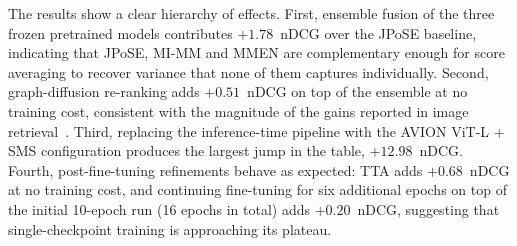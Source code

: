 \begin{table}[t]
\centering
\small
\caption{Official Codabench nDCG~AVG (\%) for the six submitted configurations of Section~\ref{sec:methods}. The $\Delta$ column reports the marginal change with respect to the previous row. Best per approach in \textbf{bold}.}
\label{tab:iterations}
\setlength{\tabcolsep}{6pt}
\end{table}

The results show a clear hierarchy of effects. First, ensemble fusion of the three frozen pretrained models contributes $+1.78$~nDCG over the JPoSE baseline, indicating that JPoSE, MI-MM and MMEN are complementary enough for score averaging to recover variance that none of them captures individually. Second, graph-diffusion re-ranking adds $+0.51$~nDCG on top of the ensemble at no training cost, consistent with the magnitude of the gains reported in image retrieval~\cite{iscen2017diffusion}. Third, replacing the inference-time pipeline with the AVION ViT-L + SMS configuration produces the largest jump in the table, $+12.98$~nDCG. Fourth, post-fine-tuning refinements behave as expected: TTA adds $+0.68$~nDCG at no training cost, and continuing fine-tuning for six additional epochs on top of the initial 10-epoch run (16 epochs in total) adds $+0.20$~nDCG, suggesting that single-checkpoint training is approaching its plateau.
